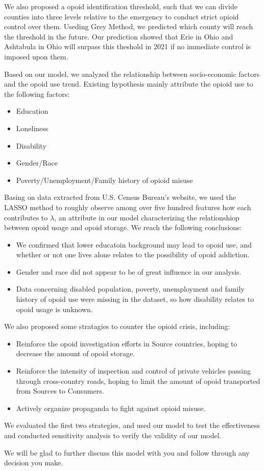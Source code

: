 We also proposed a opoid identification threshold, such that we can divide counties into three levels relative to the emergency to conduct strict opioid control over them. Useding Grey Method, we predicted which county will reach the threshold in the future. Our prediction showed that Erie in Ohio and Ashtabula in Ohio will surpass this theshold in 2021 if no immediate control is imposed upon them.

Based on our model, we analyzed the relationship between socio-economic factors and the opoid use trend. Existing hypothesis mainly attribute the opioid use to the following factors:
\begin{itemize}\setlength{\itemsep}{0pt}
	\item Education
	\item Loneliness
	\item Disability
	\item Gender/Race
	\item Poverty/Unemployment/Family history of opioid misuse
\end{itemize}

Basing on data extracted from U.S. Census Bureau's website, we used the LASSO method to roughly observe among over five hundred features how each contributes to $\lambda$, an attribute in our model characterizing the relationshiop between opoid usage and opoid storage. We reach the following conclusions:
\begin{itemize}
	\item We confirmed that lower educatoin background may lead to opoid use, and whether or not one lives alone relates to the possibility of opoid addiction.
	\item Gender and race did not appear to be of great influence in our analysis.
	\item Data concerning disabled population, poverty, unemployment and family history of opoid use were missing in the dataset, so how disability relates to opoid usage is unknown.
\end{itemize}

We also proposed some stratagies to counter the opioid crisis, including:
\begin{itemize}
	\item Reinforce the opoid investigation efforts in Source countries, hoping to decrease the amount of opoid storage.
	\item Reinforce the intensity of inspection and control of private vehicles passing through cross-country roads, hoping to limit the amount of opoid transported from Sources to Consumers.
	\item Actively organize propaganda to fight against opioid misuse.
\end{itemize}

We evaluated the first two strategies, and used our model to test the effectiveness and conducted sensitivity analysis to verify the validity of our model.

We will be glad to further discuss this model with you and follow through any decision you make. 
